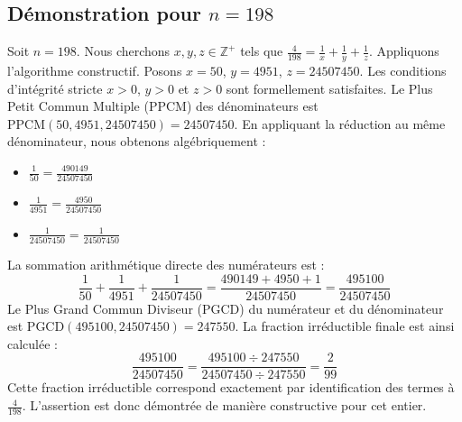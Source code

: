 \documentclass[11pt,a4paper]{article}
\begin{document}
\subsection{Démonstration pour $n = 198$}
Soit $n = 198$. Nous cherchons $x, y, z \in \mathbb{Z}^{+}$ tels que $\frac{4}{198} = \frac{1}{x} + \frac{1}{y} + \frac{1}{z}$.
Appliquons l'algorithme constructif. Posons $x = 50$, $y = 4951$, $z = 24507450$.
Les conditions d'intégrité stricte $x > 0$, $y > 0$ et $z > 0$ sont formellement satisfaites.
Le Plus Petit Commun Multiple (PPCM) des dénominateurs est $\text{PPCM}(50, 4951, 24507450) = 24507450$.
En appliquant la réduction au même dénominateur, nous obtenons algébriquement :
\begin{itemize}
    \item $\frac{1}{50} = \frac{490149}{24507450}$
    \item $\frac{1}{4951} = \frac{4950}{24507450}$
    \item $\frac{1}{24507450} = \frac{1}{24507450}$
\end{itemize}
La sommation arithmétique directe des numérateurs est :
$$ \frac{1}{50} + \frac{1}{4951} + \frac{1}{24507450} = \frac{490149 + 4950 + 1}{24507450} = \frac{495100}{24507450} $$
Le Plus Grand Commun Diviseur (PGCD) du numérateur et du dénominateur est $\text{PGCD}(495100, 24507450) = 247550$.
La fraction irréductible finale est ainsi calculée :
$$ \frac{495100}{24507450} = \frac{495100 \div 247550}{24507450 \div 247550} = \frac{2}{99} $$
Cette fraction irréductible correspond exactement par identification des termes à $\frac{4}{198}$. L'assertion est donc démontrée de manière constructive pour cet entier.
\end{document}
